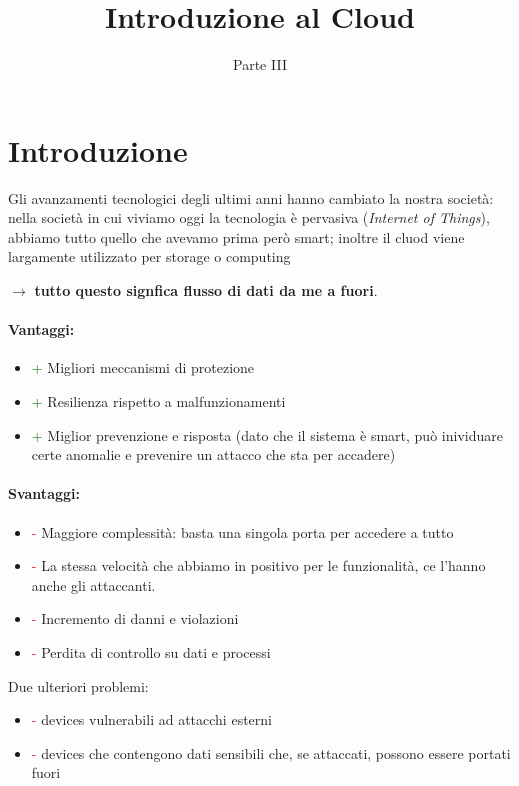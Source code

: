 \documentclass{report}
\title{Introduzione al Cloud}
\date{Parte III}
\begin{document}
\maketitle

\tableofcontents
\newpage

\chapter{Introduzione}
Gli avanzamenti tecnologici degli ultimi anni hanno cambiato 
la nostra società: nella società in cui viviamo oggi la tecnologia è 
pervasiva (\textit{Internet of Things}), abbiamo tutto quello che avevamo
prima però smart; inoltre il cluod viene largamente utilizzato per storage o computing

$ \rightarrow $ \textbf{tutto questo
signfica flusso di dati da me a fuori}.

\subsubsection{Vantaggi:}
\begin{itemize}
    \item \textcolor{darkgreen}{+} Migliori meccanismi di protezione
    \item \textcolor{darkgreen}{+} Resilienza rispetto a malfunzionamenti
    \item \textcolor{darkgreen}{+} Miglior prevenzione e risposta (dato che il sistema è smart, può inividuare certe anomalie e prevenire 
    un attacco che sta per accadere)
\end{itemize}

\subsubsection{Svantaggi:}
\begin{itemize}
    \item \textcolor{red}{-} Maggiore complessità: basta una singola porta per accedere a tutto
    \item \textcolor{red}{-} La stessa velocità che abbiamo in positivo per le funzionalità, ce l'hanno anche gli attaccanti.
    \item \textcolor{red}{-} Incremento di danni e violazioni
    \item \textcolor{red}{-} Perdita di controllo su dati e processi
\end{itemize}

Due ulteriori problemi:
\begin{itemize}
    \item \textcolor{red}{-} devices vulnerabili ad attacchi esterni
    \item \textcolor{red}{-} devices che contengono dati sensibili che, se attaccati, possono essere portati fuori
\end{itemize}
\end{document}
